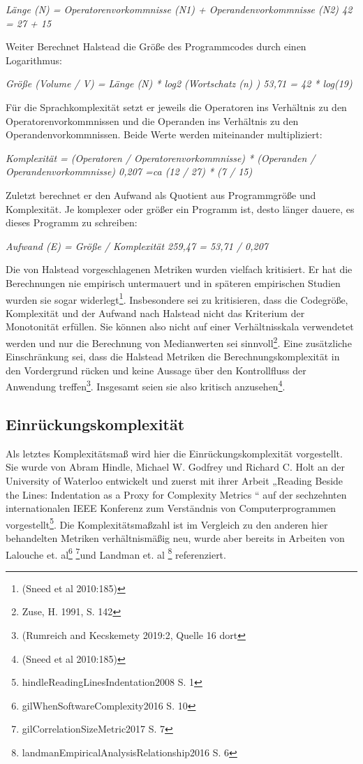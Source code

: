 \emph{Länge (N) = Operatorenvorkommnisse (N1) + Operandenvorkommnisse
(N2) 42 = 27 + 15}

Weiter Berechnet Halstead die Größe des Programmcodes durch einen
Logarithmus:

\emph{Größe (Volume / V) = Länge (N) * log2 (Wortschatz (n) ) 53,71 = 42
* log(19)}

Für die Sprachkomplexität setzt er jeweils die Operatoren ins Verhältnis
zu den Operatorenvorkommnissen und die Operanden ins Verhältnis zu den
Operandenvorkommnissen. Beide Werte werden miteinander multipliziert:

\emph{Komplexität = (Operatoren / Operatorenvorkommnisse) * (Operanden /
Operandenvorkommnisse) 0,207 =ca (12 / 27) * (7 / 15)}

Zuletzt berechnet er den Aufwand als Quotient aus Programmgröße und
Komplexität. Je komplexer oder größer ein Programm ist, desto länger
dauere, es dieses Programm zu schreiben:

\emph{Aufwand (E) = Größe / Komplexität 259,47 = 53,71 / 0,207}

Die von Halstead vorgeschlagenen Metriken wurden vielfach kritisiert. Er
hat die Berechnungen nie empirisch untermauert und in späteren
empirischen Studien wurden sie sogar widerlegt\footnote{(Sneed et al
  2010:185)}. Insbesondere sei zu kritisieren, dass die Codegröße,
Komplexität und der Aufwand nach Halstead nicht das Kriterium der
Monotonität erfüllen. Sie können also nicht auf einer Verhältnisskala
verwendetet werden und nur die Berechnung von Medianwerten sei
sinnvoll\footnote{Zuse, H. 1991, S. 142}. Eine zusätzliche Einschränkung
sei, dass die Halstead Metriken die Berechnungskomplexität in den
Vordergrund rücken und keine Aussage über den Kontrollfluss der
Anwendung treffen\footnote{(Rumreich and Kecskemety 2019:2, Quelle 16
  dort}. Insgesamt seien sie also kritisch anzusehen\footnote{(Sneed et
  al 2010:185)}.


\subsection{Einrückungskomplexität}\label{Einruckungskomplexitat}

Als letztes Komplexitätsmaß wird hier die Einrückungskomplexität
vorgestellt. Sie wurde von Abram Hindle, Michael W. Godfrey und Richard
C. Holt an der University of Waterloo entwickelt und zuerst mit ihrer
Arbeit „Reading Beside the Lines: Indentation as a Proxy for Complexity
Metrics `` auf der sechzehnten internationalen IEEE Konferenz zum
Verständnis von Computerprogrammen vorgestellt\footnote{hindleReadingLinesIndentation2008
  S. 1}. Die Komplexitätsmaßzahl ist im Vergleich zu den anderen hier
behandelten Metriken verhältnismäßig neu, wurde aber bereits in Arbeiten
von Lalouche et. al\footnote{gilWhenSoftwareComplexity2016 S. 10}
\footnote{gilCorrelationSizeMetric2017 S. 7}und Landman et. al
\footnote{landmanEmpiricalAnalysisRelationship2016 S. 6} referenziert.

